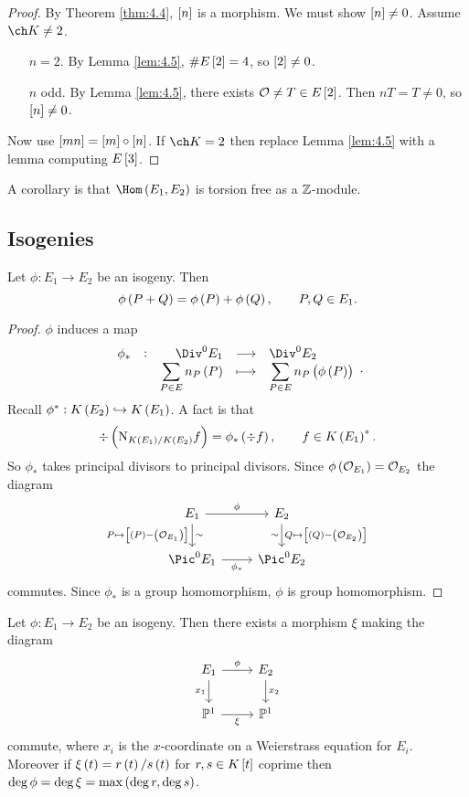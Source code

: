 \begin{proof}
By Theorem \ref{thm:4.4}, $ \sbr{n} $ is a morphism. We must show $ \sbr{n} \ne 0 $. Assume $ \ch K \ne 2 $.
\begin{itemize}[leftmargin=0.5in]
\item[$ n = 2 $.] By Lemma \ref{lem:4.5}, $ \#E\sbr{2} = 4 $, so $ \sbr{2} \ne 0 $.
\item[$ n $ odd.] By Lemma \ref{lem:4.5}, there exists $ \OOO \ne T \in E\sbr{2} $. Then $ nT = T \ne 0 $, so $ \sbr{n} \ne 0 $.
\end{itemize}
Now use $ \sbr{mn} = \sbr{m} \circ \sbr{n} $. If $ \ch K = 2 $ then replace Lemma \ref{lem:4.5} with a lemma computing $ E\sbr{3} $.
\end{proof}

A corollary is that $ \Hom\br{E_1, E_2} $ is torsion free as a $ \mathbb{Z} $-module.

\subsection{Isogenies}

\begin{lemma}
Let $ \phi : E_1 \to E_2 $ be an isogeny. Then
$$ \phi\br{P + Q} = \phi\br{P} + \phi\br{Q}, \qquad P, Q \in E_1. $$
\end{lemma}

\begin{proof}
$ \phi $ induces a map
$$ \function[\phi_*]{\Div^0 E_1}{\Div^0 E_2}{\sum_{P \in E} n_P\br{P}}{\sum_{P \in E} n_P\br{\phi\br{P}}}. $$
Recall $ \phi^* : K\br{E_2} \hookrightarrow K\br{E_1} $. A fact is that
$$ \div \br{\N_{K\br{E_1} / K\br{E_2}} f} = \phi_*\br{\div f}, \qquad f \in K\br{E_1}^*. $$
So $ \phi_* $ takes principal divisors to principal divisors. Since $ \phi\br{\OOO_{E_1}} = \OOO_{E_2} $ the diagram
$$
\begin{tikzcd}
E_1 \arrow{r}{\phi} \arrow{d}{\sim}[swap]{P \mapsto \sbr{\br{P} - \br{\OOO_{E_1}}}} & E_2 \arrow{d}{Q \mapsto \sbr{\br{Q} - \br{\OOO_{E_2}}}}[swap]{\sim} \\
\Pic^0 E_1 \arrow{r}[swap]{\phi_*} & \Pic^0 E_2
\end{tikzcd}
$$
commutes. Since $ \phi_* $ is a group homomorphism, $ \phi $ is group homomorphism.
\end{proof}

\begin{lemma}
\label{lem:5.3}
Let $ \phi : E_1 \to E_2 $ be an isogeny. Then there exists a morphism $ \xi $ making the diagram
$$
\begin{tikzcd}
E_1 \arrow{r}{\phi} \arrow{d}[swap]{x_1} & E_2 \arrow{d}{x_2} \\
\PP^1 \arrow{r}[swap]{\xi} & \PP^1
\end{tikzcd}
$$
commute, where $ x_i $ is the $ x $-coordinate on a Weierstrass equation for $ E_i $. Moreover if $ \xi\br{t} = r\br{t} / s\br{t} $ for $ r, s \in K\sbr{t} $ coprime then $ \deg \phi = \deg \xi = \max\br{\deg r, \deg s} $.
\end{lemma}

